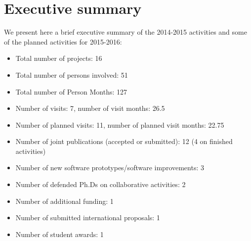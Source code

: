 \section*{Executive summary}

We present here a brief executive summary of the 2014-2015 activities and some of the planned activities for 2015-2016:

\begin{itemize}
\item Total number of projects: 16
    \vspace{-0.5\baselineskip}
\item Total number of persons involved: 51
    \vspace{-0.5\baselineskip}
\item Total number of Person Months: 127
\item Number of visits: 7, number of visit months: 26.5
\item Number of planned visits: 11, number of planned visit months: 22.75
\item Number of joint publications (accepted or submitted): 12 (4 on finished activities)
\item Number of new software prototypes/software improvements: 3
\item Number of defended Ph.Ds on collaborative activities: 2
\item Number of additional funding: 1 
\item Number of submitted international proposals: 1
\item Number of student awards: 1
\end{itemize}
